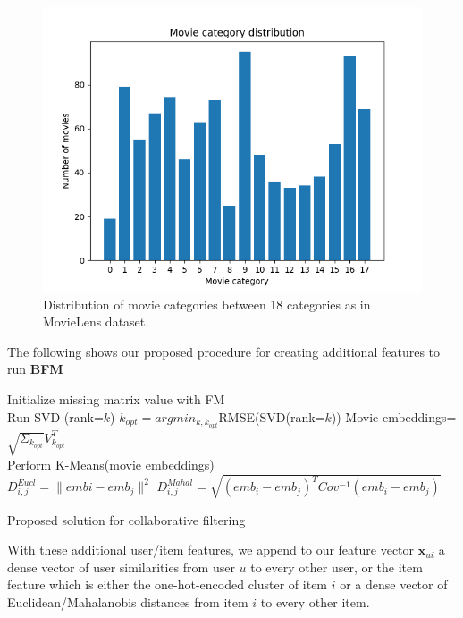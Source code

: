 \documentclass[10pt,conference,compsocconf]{IEEEtran}
\begin{document}
    \begin{figure}
        \includegraphics[width=\columnwidth]{figures/movie_category_distribution.png}
        \caption{Distribution of movie categories between 18 categories as in MovieLens dataset.}
        \label{fig:movie_category_distribution}
    \end{figure}

    The following  shows our proposed procedure for creating additional features to run \textbf{BFM}

    \begin{algorithm}
        Initialize missing matrix value with FM\\
         {
            Run SVD (rank=$k$)
            $k_{opt}=argmin_{k, k_{opt}}$RMSE(SVD(rank=$k$))
        }
        Movie embeddings= $\sqrt{\Sigma_{k_{opt}}}V_{k_{opt}}^T$\\
        Perform K-Means(movie embeddings)\\
         {
             {
                $D_{i,j} ^{Eucl} = \|embi - emb_j\|^2$
            }
        }
         {
             {
                $D_{i,j} ^{Mahal} = \sqrt{(emb_i-emb_j)^TCov^{-1}(emb_i-emb_j)}$
            }
        }
        \caption{Proposed solution for collaborative filtering}
        \label{alg:algo1}
    \end{algorithm}

    With these additional user/item features, we append to our feature vector $\mathbf{x}_{ui}$ a dense vector of user similarities from user $u$ to every other user, or the item feature which is either the one-hot-encoded cluster of item $i$ or a dense vector of Euclidean/Mahalanobis distances from item $i$ to every other item.
\end{document}
